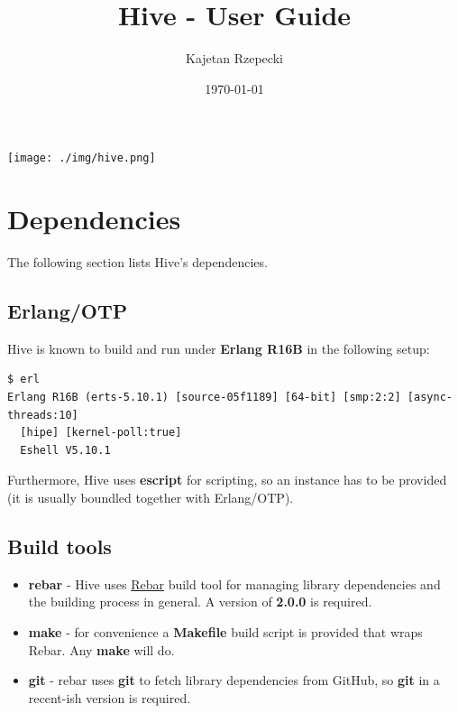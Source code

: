 \documentclass[a4paper]{article}
\title{\textbf{Hive  - User Guide}}
\author{Kajetan Rzepecki}
\date{\today}
\begin{document}
\maketitle


\vfill
\begin{center}
\texttt{[image: ./img/hive.png]}
\end{center}

\vfill

\thispagestyle{empty}
\pagebreak

\tableofcontents

\pagebreak
\section{Dependencies}
\label{sec-1}

The following section lists Hive's dependencies.
\subsection{Erlang/OTP}
\label{sec-1-1}

Hive is known to build and run under \textbf{Erlang R16B} in the following setup:


\begin{verbatim}
$ erl
Erlang R16B (erts-5.10.1) [source-05f1189] [64-bit] [smp:2:2] [async-threads:10]
  [hipe] [kernel-poll:true]
  Eshell V5.10.1
\end{verbatim}



\noindent
Furthermore, Hive uses \textbf{escript} for scripting, so an instance has to be provided (it is usually boundled together with Erlang/OTP).
\subsection{Build tools}
\label{sec-1-2}


\begin{itemize}
\item \textbf{rebar} - Hive uses \href{https://github.com/basho/rebar}{Rebar} build tool for managing library dependencies and the building process in general. A version of \textbf{2.0.0} is required.
\item \textbf{make} - for convenience a \textbf{Makefile} build script is provided that wraps Rebar. Any \textbf{make} will do.
\item \textbf{git} - rebar uses \textbf{git} to fetch library dependencies from GitHub, so \textbf{git} in a recent-ish version is required.
\end{itemize}
\end{document}
